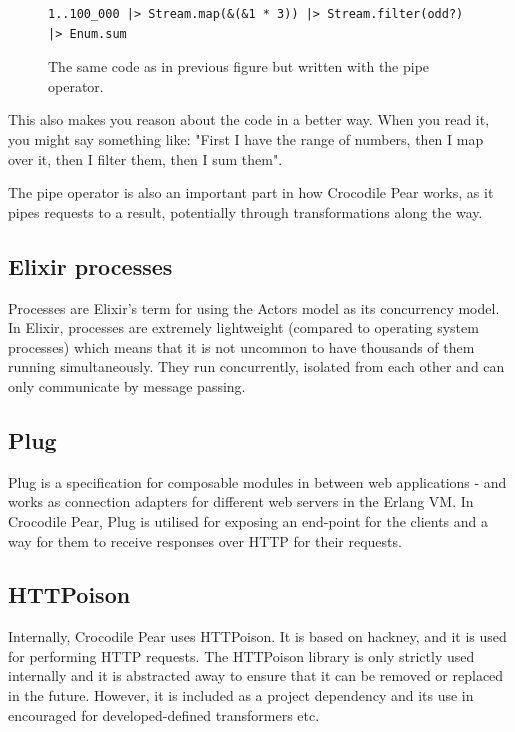 \documentclass{cslthse-msc}
\begin{document}
\begin{figure}[H]
  \centering
\begin{lstlisting}[breaklines=true,frame=single]
1..100_000 |> Stream.map(&(&1 * 3)) |> Stream.filter(odd?) |> Enum.sum
\end{lstlisting}
  \caption{The same code as in previous figure but written with the pipe operator.}
\end{figure}

This also makes you reason about the code in a better way. When you read it, you might say something like: "First I have the range of numbers, then I map over it, then I filter them, then I sum them".

The pipe operator is also an important part in how Crocodile Pear works, as it pipes requests to a result, potentially through transformations along the way.

\subsection{Elixir processes}
Processes are Elixir's term for using the Actors model as its concurrency model. In Elixir, processes are extremely lightweight (compared to operating system processes) which means that it is not uncommon to have thousands of them running simultaneously. They run concurrently, isolated from each other and can only communicate by message passing\cite{elixir_processes}.

\subsection{Plug}
Plug is a specification for composable modules in between web applications - and works as connection adapters for different web servers in the Erlang VM\cite{plug}. In Crocodile Pear, Plug is utilised for exposing an end-point for the clients and a way for them to receive responses over HTTP for their requests.

\subsection{HTTPoison}
Internally, Crocodile Pear uses HTTPoison\cite{httpoison}. It is based on hackney\cite{hackney}, and it is used for performing HTTP requests. The HTTPoison library is only strictly used internally and it is abstracted away to ensure that it can be removed or replaced in the future. However, it is included as a project dependency and its use in encouraged for developed-defined transformers etc.
\end{document}
